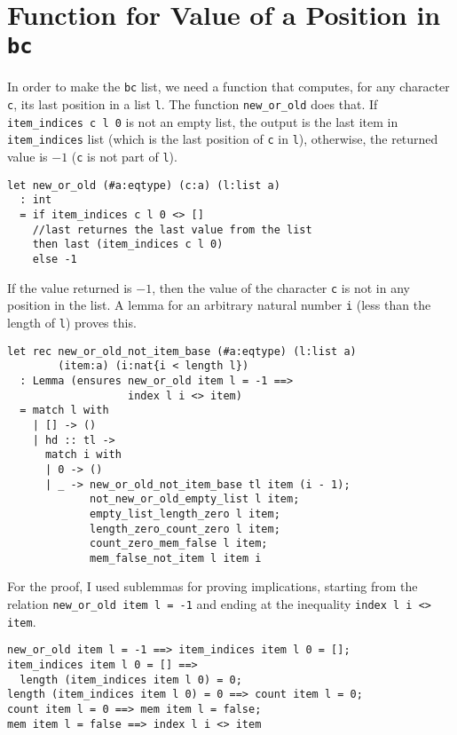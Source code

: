 \section{Function for Value of a Position in \texttt{bc}}

In order to make the \texttt{bc} list, we need a function that computes, for any character \texttt{c}, its last position in a list \texttt{l}. The function \texttt{new\_or\_old} does that. If \texttt{item\_indices c l 0} is not an empty list, the output is the last item in \texttt{item\_indices} list (which is the last position of \texttt{c} in \texttt{l}), otherwise, the returned value is \(-1\) (\texttt{c} is not part of \texttt{l}).

\begin{verbatim}
let new_or_old (#a:eqtype) (c:a) (l:list a) 
  : int
  = if item_indices c l 0 <> []
    //last returnes the last value from the list
    then last (item_indices c l 0)
    else -1
\end{verbatim}

If the value returned is \(-1\), then the value of the character \texttt{c} is not in any position in the list. A lemma for an arbitrary natural number \texttt{i} (less than the length of \texttt{l}) proves this. 

\begin{verbatim}
let rec new_or_old_not_item_base (#a:eqtype) (l:list a)
        (item:a) (i:nat{i < length l})
  : Lemma (ensures new_or_old item l = -1 ==>
                   index l i <> item)
  = match l with 
    | [] -> ()
    | hd :: tl -> 
      match i with 
      | 0 -> ()
      | _ -> new_or_old_not_item_base tl item (i - 1);
             not_new_or_old_empty_list l item;
             empty_list_length_zero l item;
             length_zero_count_zero l item;
             count_zero_mem_false l item;
             mem_false_not_item l item i
\end{verbatim}

For the proof, I used sublemmas for proving implications, starting from the relation \texttt{new\_or\_old item l = -1} and ending at the inequality \texttt{index l i <> item}.

\begin{verbatim}
new_or_old item l = -1 ==> item_indices item l 0 = [];
item_indices item l 0 = [] ==> 
  length (item_indices item l 0) = 0;
length (item_indices item l 0) = 0 ==> count item l = 0;
count item l = 0 ==> mem item l = false;
mem item l = false ==> index l i <> item
\end{verbatim}

